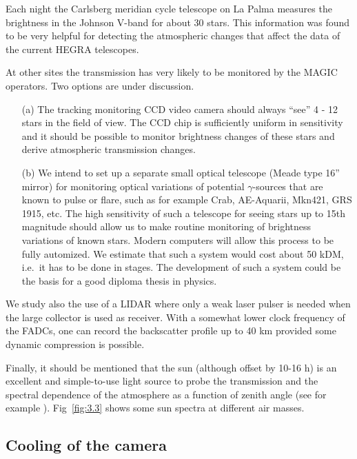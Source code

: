 Each night the Carlsberg meridian cycle telescope on La Palma measures the
brightness in the Johnson V-band for about 30 stars. This information was
found to be very helpful for detecting the atmospheric changes that affect
the data of the current HEGRA telescopes.

At other sites the transmission has very likely to be monitored by the MAGIC
operators. Two options are under discussion.

\begin{itemize}
\item[(a)]  The tracking monitoring CCD video camera should always ``see'' 4
- 12 stars in the field of view. The CCD chip is sufficiently uniform in
sensitivity and it should be possible to monitor brightness changes of these
stars and derive atmospheric transmission changes.

\item[(b)]  We intend to set up a separate small optical telescope (Meade
type 16'' mirror) for monitoring optical variations of potential $\gamma$-sources
that are known to
pulse or flare, such as for example Crab,
AE-Aquarii, Mkn421, GRS 1915,
etc. The high sensitivity of such a telescope for seeing stars up to 15th
magnitude should allow us to make routine monitoring of brightness
variations of known stars. Modern computers will allow this process to be
fully automized. We estimate that such a system would cost about 50
kDM, i.e.\ it has to be done in stages. The development of such a system
could be the basis for a good diploma thesis in physics.
\end{itemize}

We study also the use of a LIDAR where only a weak laser pulser is needed
when the large collector is used as receiver. With a somewhat lower clock
frequency of the FADCs, one can record the backscatter profile up to 40 km
provided some dynamic compression is possible.

Finally, it should be mentioned that the sun (although offset by 10-16 h) is
an excellent and simple-to-use light source to probe the transmission and
the spectral dependence of the atmosphere as a function of zenith angle (see
for example \cite{winter:91}). Fig~\ref{fig:3.3} shows some 
sun spectra at different air masses.

\subsection{Cooling of the camera}


